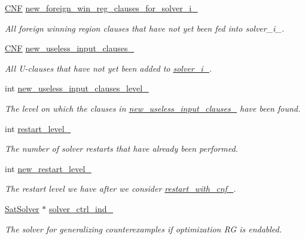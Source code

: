 \begin{DoxyCompactItemize}
\hyperlink{classCNF}{C\-N\-F} \hyperlink{classClauseExplorerSAT_a70c8edd590d75994ee354d591909cd35}{new\-\_\-foreign\-\_\-win\-\_\-reg\-\_\-clauses\-\_\-for\-\_\-solver\-\_\-i\-\_\-}
\begin{DoxyCompactList}\small\item\em All foreign winning region clauses that have not yet been fed into solver\-\_\-i\-\_\-. \end{DoxyCompactList}\item 
\hyperlink{classCNF}{C\-N\-F} \hyperlink{classClauseExplorerSAT_a3d1bdb9a6484c85af655a4eed1ee5f19}{new\-\_\-useless\-\_\-input\-\_\-clauses\-\_\-}
\begin{DoxyCompactList}\small\item\em All U-\/clauses that have not yet been added to \hyperlink{classClauseExplorerSAT_a65b5b3d04ff5be8bfec60d3dcf86e4d0}{solver\-\_\-i\-\_\-}. \end{DoxyCompactList}\item 
int \hyperlink{classClauseExplorerSAT_a67eeafbba9da9c87534f7ef26531a57a}{new\-\_\-useless\-\_\-input\-\_\-clauses\-\_\-level\-\_\-}
\begin{DoxyCompactList}\small\item\em The level on which the clauses in \hyperlink{classClauseExplorerSAT_a3d1bdb9a6484c85af655a4eed1ee5f19}{new\-\_\-useless\-\_\-input\-\_\-clauses\-\_\-} have been found. \end{DoxyCompactList}\item 
int \hyperlink{classClauseExplorerSAT_a0b5d716111026dd1cb4efe5855e2fe2f}{restart\-\_\-level\-\_\-}
\begin{DoxyCompactList}\small\item\em The number of solver restarts that have already been performed. \end{DoxyCompactList}\item 
int \hyperlink{classClauseExplorerSAT_adf9bfe4390d34e57e25f269afa1e7b25}{new\-\_\-restart\-\_\-level\-\_\-}
\begin{DoxyCompactList}\small\item\em The restart level we have after we consider \hyperlink{classClauseExplorerSAT_a1a9dc7f76967c8164e9625df34dec172}{restart\-\_\-with\-\_\-cnf\-\_\-}. \end{DoxyCompactList}\item 
\hyperlink{classSatSolver}{Sat\-Solver} $\ast$ \hyperlink{classClauseExplorerSAT_aba4c9ed8ccc28d89c094f3cd80157f3f}{solver\-\_\-ctrl\-\_\-ind\-\_\-}
\begin{DoxyCompactList}\small\item\em The solver for generalizing counterexamples if optimization R\-G is endabled. \end{DoxyCompactList}\item 

\end{DoxyCompactItemize}
